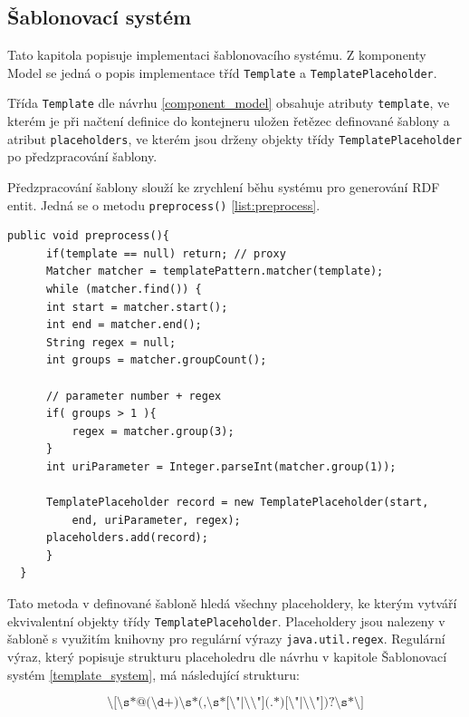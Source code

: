 \documentclass[thesis=B,czech]{FITthesis}[2012/06/26]
\begin{document}
  \subsection{Šablonovací systém}
  Tato kapitola popisuje implementaci šablonovacího systému. Z komponenty Model se jedná o popis implementace tříd \texttt{Template} a \texttt{TemplatePlaceholder}.
  
  Třída \texttt{Template} dle návrhu \ref{component_model} obsahuje atributy \texttt{template}, ve kterém je při načtení definice do kontejneru uložen řetězec
  definované šablony a atribut \texttt{placeholders}, ve kterém jsou drženy objekty třídy \texttt{TemplatePlaceholder} po předzpracování šablony.
  
  Předzpracování šablony slouží ke zrychlení běhu systému pro generování RDF entit. Jedná se o metodu \texttt{preprocess()} \ref{list:preprocess}.
  
  \begin{lstlisting}[float=htb,caption={Metoda preprocess(): předzpracování šablony},label=list:preprocess]
public void preprocess(){
      if(template == null) return; // proxy
      Matcher matcher = templatePattern.matcher(template);
      while (matcher.find()) {
	  int start = matcher.start();
	  int end = matcher.end();
	  String regex = null;
	  int groups = matcher.groupCount();

	  // parameter number + regex
	  if( groups > 1 ){
	      regex = matcher.group(3);
	  }
	  int uriParameter = Integer.parseInt(matcher.group(1));

	  TemplatePlaceholder record = new TemplatePlaceholder(start,
	      end, uriParameter, regex);
	  placeholders.add(record);
      }
  }
\end{lstlisting}
  
  Tato metoda v definované šabloně hledá všechny placeholdery, ke kterým vytváří ekvivalentní objekty třídy \texttt{TemplatePlaceholder}.
  Placeholdery jsou nalezeny v šabloně s využitím knihovny pro regulární výrazy \texttt{java.util.regex}. 
  Regulární výraz, který popisuje strukturu placeholedru dle návrhu v kapitole Šablonovací systém \ref{template_system}, má následující strukturu:
  
     \begin{equation}\label{regex_impl}
  \texttt{\textbackslash[\textbackslash s*@(\textbackslash d+)\textbackslash s*(,\textbackslash s*[\textbackslash"|\textbackslash \textbackslash"](.*)[\textbackslash"|\textbackslash \textbackslash"])?\textbackslash s*\textbackslash]} 
 \end{equation}
 
\end{document}
